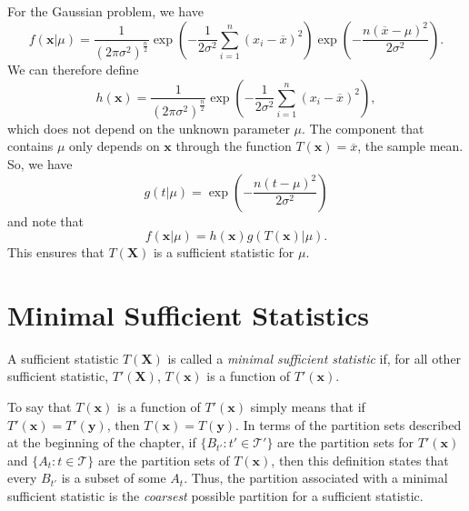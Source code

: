 For the Gaussian problem, we have
\begin{equation*}
f(\mathbf{x}|\mu) = \frac{1}{(2 \pi \sigma^2)^{\frac{n}{2}}}
\exp \left( - \frac{1}{2 \sigma^2} \sum_{i=1}^n (x_i - \overline{x})^2 \right)
\exp \left( - \frac{n (\overline{x} - \mu)^2 }{2 \sigma^2} \right) .
\end{equation*}
We can therefore define
\begin{equation*}
h(\mathbf{x}) = \frac{1}{(2 \pi \sigma^2)^{\frac{n}{2}}}
\exp \left( - \frac{1}{2 \sigma^2} \sum_{i=1}^n (x_i - \overline{x})^2 \right) ,
\end{equation*}
which does not depend on the unknown parameter $\mu$.
The component that contains $\mu$ only depends on $\mathbf{x}$ through the function $T(\mathbf{x}) = \overline{x}$, the sample mean.
So, we have
\begin{equation*}
g(t|\mu) = \exp \left( - \frac{n (t - \mu)^2 }{2 \sigma^2} \right)
\end{equation*}
and note that
\begin{equation*}
f(\mathbf{x}|\mu) = h(\mathbf{x}) g(T(\mathbf{x})|\mu) .
\end{equation*}
This ensures that $T(\mathbf{X})$ is a sufficient statistic for $\mu$.


\newpage

\section{Minimal Sufficient Statistics}

\begin{definition} \label{definition:MinimalSufficientStatistic}
A sufficient statistic $T(\mathbf{X})$ is called a \emph{minimal sufficient statistic} if, for all other sufficient statistic, $T'(\mathbf{X})$, $T(\mathbf{x})$ is a function of $T'(\mathbf{x})$.
\end{definition}

To say that $T(\mathbf{x})$ is a function of $T'(\mathbf{x})$ simply means that if $T'(\mathbf{x}) = T'(\mathbf{y})$, then $T(\mathbf{x}) = T(\mathbf{y})$.
In terms of the partition sets described at the beginning of the chapter, if $\{ B_{t'}:t' \in \mathcal{T}'\}$ are the partition sets for $T'(\mathbf{x})$ and $\{ A_t : t \in \mathcal{T} \}$ are the partition sets of $T(\mathbf{x})$, then this definition states that every $B_{t'}$ is a subset of some $A_{t}$.
Thus, the partition associated with a minimal sufficient statistic is the \emph{coarsest} possible partition for a sufficient statistic.


